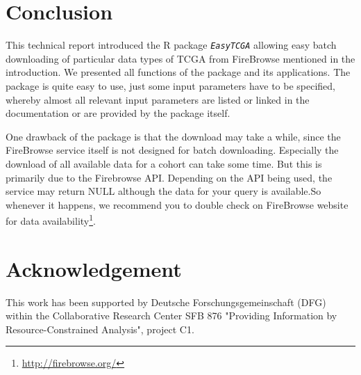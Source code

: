 \documentclass{TechReport}
\begin{document}
\section{Conclusion}
This technical report introduced the R package \texttt{\em EasyTCGA} allowing
easy batch downloading of particular data types of TCGA from
FireBrowse mentioned in the introduction.  We presented all functions
of the package and its applications. The package is quite easy to use,
just some input parameters have to be specified, whereby almost all
relevant input parameters are
listed or linked in the documentation or are provided by the package itself.

One drawback of the package is that the download may take a while,
since the FireBrowse service itself is not designed for batch
downloading. Especially the download of all available data for a
cohort can take some time. But this is primarily due to the Firebrowse
API. Depending on the API being used, the service may return NULL
although the data for your query is available.So whenever it happens, 
we recommend you to double check on FireBrowse website
for data availability\footnote{\url{http://firebrowse.org/}}.





\newpage
\section*{Acknowledgement}

This work has been supported by Deutsche Forschungsgemeinschaft
   (DFG) within the Collaborative Research Center SFB 876 "Providing
   Information by Resource-Constrained Analysis", project C1.
\end{document}
